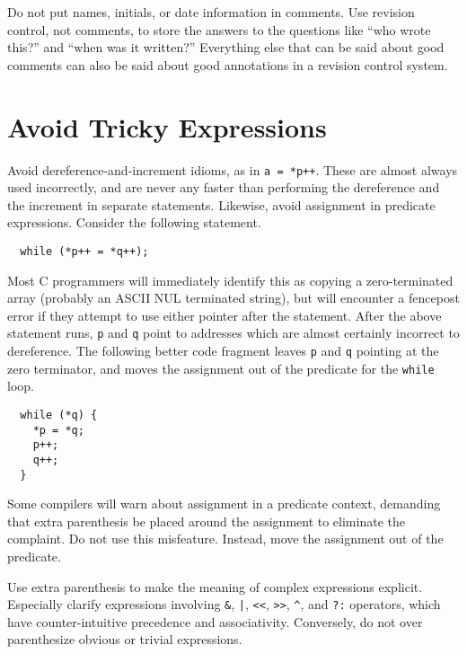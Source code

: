 \documentclass{lulu}
\newcommand{\code}[1]{\texttt{#1}\xspace}
\begin{document}
Do not put names, initials, or date information in comments.  Use
revision control, not comments, to store the answers to the questions
like ``who wrote this?'' and ``when was it written?''  Everything else
that can be said about good comments can also be said about good
annotations in a revision control system.

\section{Avoid Tricky Expressions}

Avoid dereference-and-increment idioms, as in \code{a = *p++}.  These
are almost always used incorrectly, and are never any faster than
performing the dereference and the increment in separate statements.
Likewise, avoid assignment in predicate expressions.  Consider the
following statement.

\begin{samepage}
\begin{verbatim}
  while (*p++ = *q++);
\end{verbatim}
\end{samepage}

Most C programmers will immediately identify this as copying a
zero-terminated array (probably an ASCII NUL terminated string), but
will encounter a fencepost error if they attempt to use either pointer
after the statement.  After the above statement runs, \code{p} and
\code{q} point to addresses which are almost certainly incorrect to
dereference.  The following better code fragment leaves \code{p} and
\code{q} pointing at the zero terminator, and moves the assignment out
of the predicate for the \code{while} loop.

\begin{samepage}
\begin{verbatim}
  while (*q) {
    *p = *q;
    p++;
    q++;
  }
\end{verbatim}
\end{samepage}

Some compilers will warn about assignment in a predicate context,
demanding that extra parenthesis be placed around the assignment to
eliminate the complaint.  Do not use this misfeature.  Instead, move
the assignment out of the predicate.

Use extra parenthesis to make the meaning of complex expressions
explicit.  Especially clarify expressions involving \code{\&},
\code{|}, \code{<<}, \code{>>}, \code{\^}, and \code{?:} operators,
which have counter-intuitive precedence and associativity.
Conversely, do not over parenthesize obvious or trivial expressions.
\end{document}
